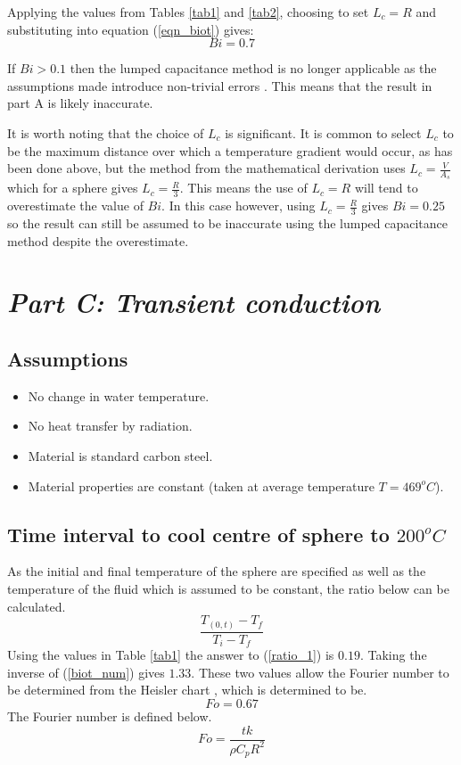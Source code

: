 \documentclass[11pt]{article}
\begin{document}
Applying the values from Tables \ref{tab1} and \ref{tab2}, choosing to set $L_{c}=R$ and substituting into equation (\ref{eqn_biot}) gives:
\begin{equation}\label{biot_num}
	Bi = 0.7
\end{equation}

If $Bi > 0.1$ then the lumped capacitance method is no longer applicable as the assumptions made introduce non-trivial errors \cite{bergman_fundamentals_2011}. This means that the result in part A is likely inaccurate.

It is worth noting that the choice of $L_c$ is significant. It is common to select $L_c$ to be the maximum distance over which a temperature gradient would occur, as has been done above, but the method from the mathematical derivation uses $L_c = \frac{V}{A_s}$ which for a sphere gives $L_c = \frac{R}{3}$. This means the use of $L_c = R$ will tend to overestimate the value of $Bi$. In this case however, using $L_c = \frac{R}{3}$ gives $Bi = 0.25$ so the result can still be assumed to be inaccurate using the lumped capacitance method despite the overestimate.

\section{\emph{Part C: Transient conduction}}
\subsection{Assumptions}
\begin{itemize}
	\item No change in water temperature.
	\item No heat transfer by radiation.
	\item Material is standard carbon steel.
	\item Material properties are constant (taken at average temperature $T = 469 ^{o}C$).
\end{itemize}
\subsection{Time interval to cool centre of sphere to $200 ^{o}C$}
As the initial and final temperature of the sphere are specified as well as the temperature of the fluid which is assumed to be constant, the ratio below can be calculated.
\begin{equation}\label{ratio_1}
	\frac{T_{(0,t)} -T_{f}}{T_{i} - T_{f}}
\end{equation}
Using the values in Table \ref{tab1} the answer to (\ref{ratio_1}) is $0.19$. Taking the inverse of (\ref{biot_num}) gives $1.33$. These two values allow the Fourier number to be determined from the Heisler chart \cite{multidimensional-transient}, which is determined to be.
\begin{equation}\label{Fr_1}
	Fo = 0.67
\end{equation}
The Fourier number is defined below.
\begin{equation}\label{Fr_2}
	Fo = \frac{tk}{\rho C_{p} R^{2}}
\end{equation}
\end{document}
